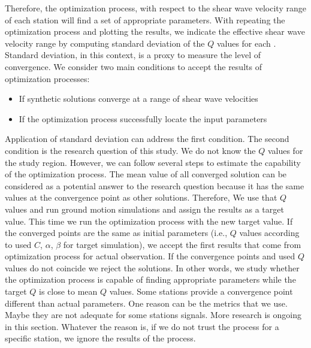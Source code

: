 Therefore, the optimization process, with respect to the shear wave velocity range of each station will find a set of appropriate parameters. With repeating the optimization process and plotting the results, we indicate the effective shear wave velocity range by computing standard deviation of the $Q$ values for each \vs{}. Standard deviation, in this context, is a proxy to measure the level of convergence. We consider two main conditions to accept the results of optimization processes:

\begin{itemize}
\item If synthetic solutions converge at a range of shear wave velocities
\item If the optimization process successfully locate the input parameters
\end{itemize}
 
 Application of standard deviation can address the first condition. The second condition is the research question of this study. We do not know the $Q$ values for the study region. However, we can follow several steps to estimate the capability of the optimization process.  The mean value of all converged solution can be considered as a potential answer to the research question because it has the same values at the convergence point as other solutions. Therefore, We use that $Q$ values and run ground motion simulations and assign the results as a target value. This time we run the optimization process with the new target value. If the converged points are the same as initial parameters (i.e., $Q$ values according to used $C$, $\alpha$, $\beta$ for target simulation), we accept the first results that come from optimization process for actual observation. If the convergence points and used $Q$ values do not coincide we reject the solutions. In other words, we study whether the optimization process is capable of finding appropriate parameters while the target $Q$ is close to mean $Q$ values. Some stations provide a convergence point different than actual parameters. One reason can be the metrics that we use. Maybe they are not adequate for some stations signals. More research is ongoing in this section. Whatever the reason is, if we do not trust the process for a specific station, we ignore the results of the process. 
 

